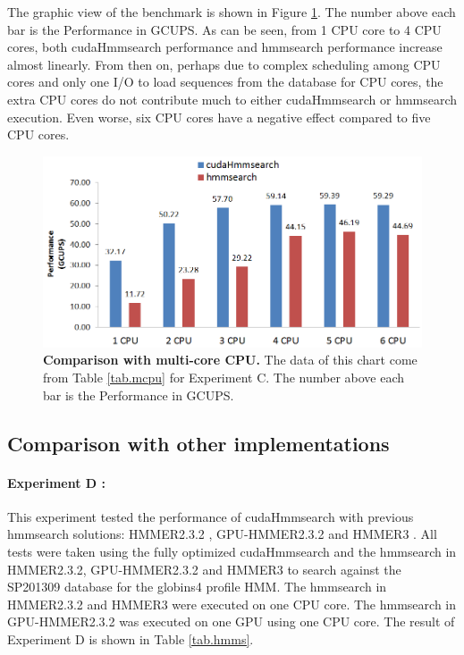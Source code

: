 The graphic view of the benchmark is shown in Figure \ref{fig:cpuCores}. The number above each bar is the Performance in GCUPS. As can be seen, from 1 CPU core to 4 CPU cores, both cudaHmmsearch performance and hmmsearch performance increase almost linearly. From then on, perhaps due to complex scheduling among CPU cores and only one I/O to load sequences from the database for CPU cores, the extra CPU cores do not contribute much to either cudaHmmsearch or hmmsearch execution. Even worse, six CPU cores have a negative effect compared to five CPU cores.

\begin{figure}[!htb]
	\centering
	\includegraphics[totalheight=0.25\textheight]{Figures/cpuCores.png}
	\caption{\selectfont \textbf{Comparison with multi-core CPU.} The data of this chart come from Table \ref{tab.mcpu} for Experiment C. The number above each bar is the Performance in GCUPS.}
	\label{fig:cpuCores}
\end{figure}

\subsection{Comparison with other implementations}
\paragraph*{Experiment D : } This experiment tested the performance of cudaHmmsearch with previous hmmsearch solutions: HMMER2.3.2 \citep{HMMER2}, GPU-HMMER2.3.2 \citep{GPUHMM} and HMMER3 \citep{Hsource}.
All tests were taken using the fully optimized cudaHmmsearch and the hmmsearch in HMMER2.3.2, GPU-HMMER2.3.2 and HMMER3 to search against the SP201309 database for the globins4 profile HMM. The hmmsearch in HMMER2.3.2 and HMMER3 were executed on one CPU core. The hmmsearch in GPU-HMMER2.3.2 was executed on one GPU using one CPU core. The result of Experiment D is shown in Table \ref{tab.hmms}.


